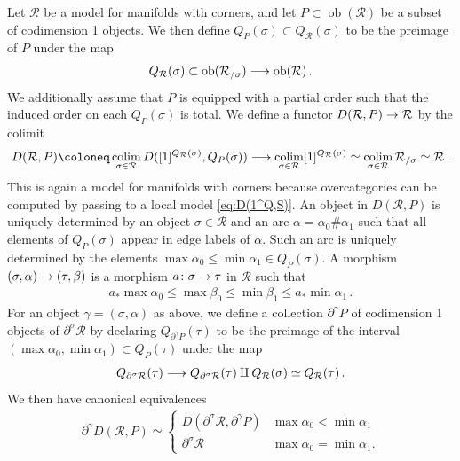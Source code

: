\documentclass[10pt]{amsart}
\numberwithin{equation}{section}
\theoremstyle{definition}
\DeclareMathOperator{\ob}{ob}
\DeclareMathOperator*{\colim}{colim}
\newcommand{\cR}{\mathcal{R}}
\newcommand{\del}{\partial}
\renewcommand{\to}{\mathchoice{\longrightarrow}{\rightarrow}{}{}}
\begin{document}
Let $\cR$ be a model for manifolds with corners, and let $P \subset \ob(\cR)$ be a subset of codimension 1 objects.
We then define $Q_{P}(\sigma) \subset Q_{\cR}(\sigma)$ to be the preimage of $P$ under the map
\begin{align*}
	Q_{\cR}(\sigma) \subset \ob(\cR_{/\sigma}) \to \ob(\cR) \,.
\end{align*}
We additionally assume that $P$ is equipped with a partial order such that the induced order on each $Q_{P}(\sigma)$ is total.
We define a functor $D(\cR,P) \to \cR$ by the colimit
\begin{align*}
	D(\cR,P) \coloneq \colim_{\sigma\in \cR} D([1]^{Q_{\cR}(\sigma)}, Q_{P}(\sigma)) \to \colim_{\sigma \in \cR}[1]^{Q_{\cR}(\sigma)} \simeq \colim_{\sigma\in \cR} \cR_{/\sigma} \simeq \cR \,.
\end{align*}
This is again a model for manifolds with corners because overcategories can be computed by passing to a local model \eqref{eq:D(1^Q,S)}.
An object in $D(\cR, P)$ is uniquely determined by an object $\sigma \in \cR$ and an arc $\alpha = \alpha_{0}\#\alpha_{1}$  such that all elements of $Q_{P}(\sigma)$ appear in edge labels of $\alpha$.
Such an arc is uniquely determined by the elements $\max \alpha_{0}\leq \min \alpha_{1}\in Q_{P}(\sigma)$.
A morphism $(\sigma, \alpha) \to (\tau, \beta)$ is a morphism $a\colon \sigma \to \tau$ in $\cR$ such that
\begin{align*}
	a_{*} \max \alpha_{0} \leq \max \beta_{0} \leq \min \beta_{1} \leq a_{*} \min \alpha_{1} \,.
\end{align*}
For an object $\gamma =(\sigma, \alpha)$ as above, we define a collection $\del^{\gamma}P$ of codimension 1 objects of $\del^{\sigma} \cR$ by declaring $Q_{\del^{\gamma}P }(\tau)$ to be the preimage of the interval $(\max \alpha_{0},\min \alpha_{1})\subset Q_{P}(\tau)$ under the map
\begin{align*}
	Q_{\del^{\sigma}\cR}(\tau)\to Q_{\del^{\sigma}\cR}(\tau) \amalg Q_{\cR}(\sigma) \simeq  Q_{\cR}(\tau) \,.
\end{align*}
We then have canonical equivalences
\begin{align}\label{eq:D(RP)}
	\del^{\gamma} D(\cR, P) \simeq
	\begin{cases}
		D(\del^{\sigma}\cR, \del^{\gamma}P) & \max \alpha_{0}< \min \alpha_{1} \\
		\del^{\sigma}\cR  & \max \alpha_{0} = \min \alpha_{1}.
	\end{cases}
\end{align}
\end{document}
